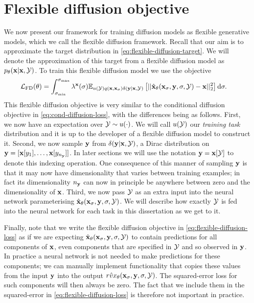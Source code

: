 \section{Flexible diffusion objective}

We now present our framework for training diffusion models as flexible generative models, which we call the flexible diffusion framework. Recall that our aim is to approximate the target distribution in \cref{eq:flexible-diffusion-target}. We will denote the approximation of this target from a flexible diffusion model as $p_\theta({\mathbf{x}}|{\mathbf{x}},{\mathcal{Y}})$. To train this flexible diffusion model we use the objective
\begin{align} \label{eq:flexible-diffusion-loss}
    \mathcal{L}_\text{FD}(\theta) &= \int_{\sigma_\text{min}}^{\sigma_\text{max}} \lambda^{\mathbf{x}}(\sigma) \mathbb{E}_{u({\mathcal{Y}})q({\mathbf{x}}, {\mathbf{x}}_\sigma)\delta({\mathbf{y}}|{\mathbf{x}},{\mathcal{Y}})} \left[ 
    || \hat{{\mathbf{x}}}_\theta({\mathbf{x}}_\sigma, {\mathbf{y}}, \sigma, {\mathcal{Y}}) - {\mathbf{x}} ||_2^2 \right] \mathrm{d}\sigma.
\end{align}
This flexible diffusion objective is very similar to the conditional diffusion objective in \cref{eq:cond-diffusion-loss}, with the differences being as follows. First, we now have an expectation over ${\mathcal{Y}} \sim u(\cdot)$. We will call $u({\mathcal{Y}})$ our \textit{training task} distribution and it is up to the developer of a flexible diffusion model to construct it. Second, we now sample ${\mathbf{y}}$ from $\delta({\mathbf{y}}|{\mathbf{x}},{\mathcal{Y}})$, a Dirac distribution on ${\mathbf{y}} = [ {\mathbf{x}}[y_1], \ldots, {\mathbf{x}}[y_{n_{\mathbf{y}}}] ]$. In later sections we will use the notation ${\mathbf{y}} = {\mathbf{x}}[{\mathcal{Y}}]$ to denote this indexing operation. One consequence of this manner of sampling ${\mathbf{y}}$ is that it may now have dimensionality that varies between training examples; in fact its dimensionality $n_{\mathbf{y}}$ can now in principle be anywhere between zero and the dimensionality of ${\mathbf{x}}$. Third, we now pass ${\mathcal{Y}}$ as an extra input into the neural network parameterising $\hat{{\mathbf{x}}}_\theta({\mathbf{x}}_\sigma, {\mathbf{y}}, \sigma, {\mathcal{Y}})$. We will describe how exactly ${\mathcal{Y}}$ is fed into the neural network for each task in this dissertation as we get to it.

Finally, note that we write the flexible diffusion objective in  \cref{eq:flexible-diffusion-loss} as if we are expecting $\hat{{\mathbf{x}}}_\theta({\mathbf{x}}_\sigma, {\mathbf{y}}, \sigma, {\mathcal{Y}})$ to contain predictions for all components of ${\mathbf{x}}$, even components that are specified in ${\mathcal{Y}}$ and so observed in ${\mathbf{y}}$. In practice a neural network is not needed to make predictions for these components; we can manually implement functionality that copies these values from the input ${\mathbf{y}}$ into the output $\hat{rvx}_\theta({\mathbf{x}}_\sigma, {\mathbf{y}}, \sigma, {\mathcal{Y}})$. The squared-error loss for such components will then always be zero. The fact that we include them in the squared-error in \cref{eq:flexible-diffusion-loss} is therefore not important in practice.


